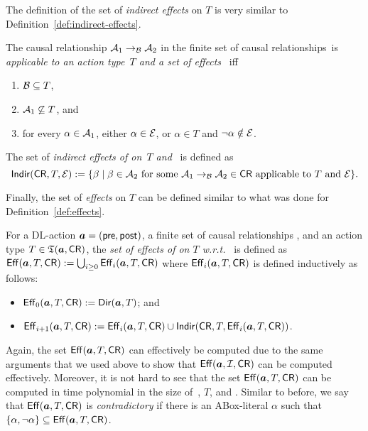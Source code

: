 \noindent
The definition of the set of \emph{indirect effects} on $T$ is very similar to
Definition~\ref{def:indirect-effects}.

\begin{definition}\label{def:indirect-effects-type}
    The causal relationship $\mathcal{A}_1\to_{\mathcal{B}}\mathcal{A}_2$ in the finite set of
    causal relationships~\CR is \emph{applicable to an action type~$T$ and a set
    of effects~\Emc} iff
    \begin{enumerate}
        \item $\mathcal{B}\subseteq T$,
        \item $\mathcal{A}_1\not\subseteq T$, and
        \item for every $\alpha\in\mathcal{A}_1$, either $\alpha\in\mathcal{E}$, or
            $\alpha\in T$ and $\lnot\alpha\notin\mathcal{E}$.
    \end{enumerate}
    The set of \emph{indirect effects of \CR on~$T$ and~\Emc} is defined as
    \[\Indir(\CR,T,\Emc):=\{\beta\mid%
        \beta\in\Amc_2\text{ for some $\causes{\Amc_1}{\Amc_2}{\Bmc}\in\CR$
        applicable to~$T$ and~\Emc}\}.\]
\end{definition}

\noindent
Finally, the set of \emph{effects} on $T$ can be defined similar to what was
done for Definition~\ref{def:effects}.

\begin{definition}\label{def:effects-type}
    For a DL-action $\boldsymbol a=(\mathsf{pre},\mathsf{post})$, a finite set of causal
    relationships \CR, and an action type $T\in\mathfrak{T}(\boldsymbol a,\mathsf{CR})$, the \emph{set of
    effects of \abf on $T$ w.r.t.~\CR} is defined as
    $\operatorname{\mathsf{Eff}}(\boldsymbol a,T,\mathsf{CR}):=\bigcup_{i\ge 0}\operatorname{\mathsf{Eff}}_i(\boldsymbol a,T,\mathsf{CR})$ where
    $\operatorname{\mathsf{Eff}}_i(\boldsymbol a,T,\mathsf{CR})$ is defined inductively as follows:
    \begin{itemize}
        \item $\operatorname{\mathsf{Eff}}_0(\boldsymbol a,T,\mathsf{CR}):=\operatorname{\mathsf{Dir}}(\boldsymbol a,T)$; and
        \item
            $\operatorname{\mathsf{Eff}}_{i+1}(\boldsymbol a,T,\mathsf{CR}):=\operatorname{\mathsf{Eff}}_i(\boldsymbol a,T,\mathsf{CR})\cup\operatorname{\mathsf{Indir}}(\mathsf{CR},T,\operatorname{\mathsf{Eff}}_i(\boldsymbol a,T,\mathsf{CR}))$.
    \end{itemize}
\end{definition}

\noindent
Again, the set $\operatorname{\mathsf{Eff}}(\boldsymbol a,T,\mathsf{CR})$ can effectively be computed due to the same
arguments that we used above to show that $\operatorname{\mathsf{Eff}}(\boldsymbol a,\mathcal{I},\mathsf{CR})$ can be computed
effectively.  Moreover, it is not hard to see that the set $\operatorname{\mathsf{Eff}}(\boldsymbol a,T,\mathsf{CR})$
can be computed in time polynomial in the size of~\abf, $T$, and \CR.
%
Similar to before, we say that $\operatorname{\mathsf{Eff}}(\boldsymbol a,T,\mathsf{CR})$ is \emph{contradictory} if
there is an ABox-literal $\alpha$ such that
$\{\alpha,\lnot\alpha\}\subseteq\operatorname{\mathsf{Eff}}(\boldsymbol a,T,\mathsf{CR})$.

